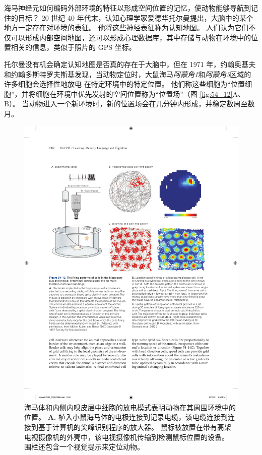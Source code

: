 海马神经元如何编码外部环境的特征以形成空间位置的记忆，使动物能够导航到记住的目标？
20 世纪 40 年代末，认知心理学家爱德华托尔曼提出，大脑中的某个地方一定存在对环境的表征。
他将这些神经表征称为认知地图。
人们认为它们不仅可以形成内部空间地图，还可以形成心理数据库，其中存储与动物在环境中的位置相关的信息，类似于照片的 GPS 坐标。


托尔曼没有机会确定认知地图是否真的存在于大脑中，但在 1971 年，约翰奥基夫和约翰多斯特罗夫斯基发现，当动物定位时，大鼠海马\textit{阿蒙角1}和\textit{阿蒙角3}区域的许多细胞会选择性地放电 在特定环境中的特定位置。
他们称这些细胞为“位置细胞”，并将细胞在环境中优先发射的空间位置称为“位置场”（图 \ref{fig:54_12}A、B）。
当动物进入一个新环境时，新的位置场会在几分钟内形成，并稳定数周至数月。


\begin{figure}[htbp]
	\centering
	\includegraphics[width=0.9\linewidth]{chap54/fig_54_12}
	\caption{海马体和内侧内嗅皮层中细胞的放电模式表明动物在其周围环境中的位置。
		\textbf{A.} 植入小鼠海马体的电极连接到记录电缆，该电缆连接到连接到基于计算机的尖峰识别程序的放大器。
		鼠标被放置在带有高架电视摄像机的外壳中，该电视摄像机传输到检测鼠标位置的设备。
		围栏还包含一个视觉提示来定位动物。
}
\end{figure}
